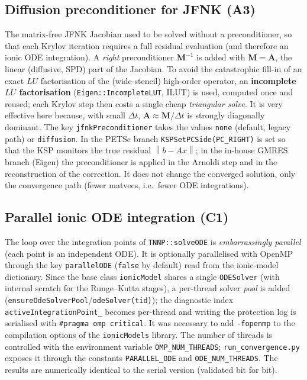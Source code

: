 \documentclass[11pt,a4paper]{article}
\newcommand{\code}[1]{\texttt{\small #1}}
\newcommand{\Mmass}{\mathbf{M}}
\newcommand{\Aimp}{\mathbf{A}}
\newcommand{\norm}[1]{\left\lVert #1 \right\rVert}
\newcommand{\pyconst}[1]{\textcolor{black!60!blue}{\texttt{\footnotesize #1}}}
\newcommand{\dictkey}[1]{\textcolor{black!60!green}{\texttt{\footnotesize #1}}}
\begin{document}
\subsection{Diffusion preconditioner for JFNK (A3)}
\label{sec:optim-A3}

The matrix-free JFNK Jacobian used to be solved without a preconditioner, so that
each Krylov iteration requires a full residual evaluation (and therefore
an ionic ODE integration). A \emph{right} preconditioner
$\mathbf{M}^{-1}$ is added with $\mathbf{M}=\Aimp$, the linear (diffusive, SPD) part
of the Jacobian. To avoid the catastrophic fill-in of an exact $LU$ factorisation
of the (wide-stencil) high-order operator, an \textbf{incomplete
$LU$ factorisation} (\code{Eigen::IncompleteLUT}, ILUT) is used, computed once and
reused; each Krylov step then costs a single cheap \emph{triangular solve}.
It is very effective here because, with small $\Delta t$, $\Aimp\approx
\Mmass/\Delta t$ is strongly diagonally dominant. The key
\dictkey{jfnkPreconditioner} takes the values \code{none} (default, legacy
path) or \code{diffusion}. In the PETSc branch \code{KSPSetPCSide(PC\_RIGHT)} is set
so that the KSP monitors the true residual $\norm{b - Ax}$; in the
in-house GMRES branch (Eigen) the preconditioner is applied in the Arnoldi step and in
the reconstruction of the correction. It does not change the converged solution, only the
convergence path (fewer matvecs, i.e.\ fewer ODE integrations).

\subsection{Parallel ionic ODE integration (C1)}
\label{sec:optim-C1}

The loop over the integration points of \code{TNNP::solveODE} is
\emph{embarrassingly parallel} (each point is an independent ODE). It is optionally
parallelised with OpenMP through the key \dictkey{parallelODE} (\code{false} by
default) read from the ionic-model dictionary. Since the base class
\code{ionicModel} shares a single \code{ODESolver} (with internal scratch for the
Runge--Kutta stages), a per-thread solver \emph{pool} is added
(\code{ensureOdeSolverPool}/\code{odeSolver(tid)}); the diagnostic index
\code{activeIntegrationPoint\_} becomes per-thread and writing the protection
log is serialised with \code{\#pragma omp critical}. It was necessary to add
\code{-fopenmp} to the compilation options of the \code{ionicModels} library.
The number of threads is controlled with the environment variable \code{OMP\_NUM\_THREADS};
\code{run\_convergence.py} exposes it through the constants \pyconst{PARALLEL\_ODE}
and \pyconst{ODE\_NUM\_THREADS}. The results are numerically identical to the
serial version (validated bit for bit).
\end{document}
